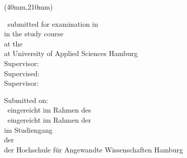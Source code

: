 %
%
\title{\IthesisTitle}   %
\author{\IthesisAuthor} %

\newpage
\thispagestyle{empty}
{\selectfont
  \hfuzz=20pt       %

  \vspace*{1cm}
  \begin{minipage}[b]{\textwidth}
    \fontsize{14pt}{20pt}
    \selectfont
    \begin{center}
      \IthesisAuthor
    \end{center}
  \end{minipage}

  \vspace{1.5cm}
  \begin{minipage}[b][0cm][t]{\textwidth}
    \fontsize{18pt}{20pt}
    \selectfont
    \begin{center}
      \IthesisTitle
    \end{center}
  \end{minipage}

  \begin{textblock*}{\textwidth}(40mm,210mm)
    \begin{minipage}[b]{\textwidth}
      \selectfont
      \fontsize{12pt}{14pt}
      \selectfont
      \ifdefined\ILanguageEN
        \IthesisKindEN ~submitted for examination in \IthesisExaminationEN \\
        in the study course \textit{\IstudyCourseName} \\
        at the \IthesisFacultyFullEN \\
        at University of Applied Sciences Hamburg\\

        Supervisor: \IfirstSv \\
        \ifdefined\IisTermPaper
        \else
          \ifdefined\IisInternshipReport
	  Supervised: \IsecondSv\\
          \else
        Supervisor: \IsecondSv \\
          \fi\fi
        
        Submitted on: \ISubDate \\
      \else
      	\ifdefined\IisInternshipReport
        \IthesisKindDE ~eingereicht im Rahmen des \IthesisExaminationDE \\	
	\else
        \IthesisKindDE ~eingereicht im Rahmen der \IthesisExaminationDE \\
        \fi
	im Studiengang \textit{\IstudyCourseName} \\
        der \IthesisFacultyFull \\
        der Hochschule für Angewandte Wissenschaften Hamburg\\


\end{minipage}
\end{textblock*}}
